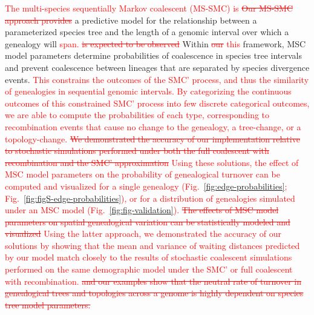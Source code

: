\documentclass[11pt]{article}
\begin{document}
\textcolor{red}{
The multi-species sequentially Markov coalescent (MS-SMC) is
\sout{Our MS-SMC approach provides}
}
a predictive model for the relationship between a parameterized species
tree and the length of a genomic interval over which a genealogy will 
\textcolor{red}{
span.
\sout{is expected to be observed}
}
% 
Within \textcolor{red}{\sout{our} this}
framework, MSC model parameters determine probabilities of coalescence
in species tree intervals and prevent coalescence between lineages that
are separated by species divergence events. 
\textcolor{red}{
This constrains the outcomes of the SMC' process, 
and thus the similarity of genealogies in sequential genomic intervals.
By categorizing the continuous outcomes of this constrained SMC' process into 
few discrete categorical outcomes, we are able to compute the probabilities of 
each type, corresponding to recombination events that cause no change to the
genealogy, a tree-change, or a topology-change.
% 
\sout{
We demonstrated the accuracy of our implementation relative to stochastic 
simulations performed under both the full coalescent with recombination 
and the SMC' approximation 
}
% 
Using these solutions, the effect of MSC model parameters on the probability
of genealogical turnover can be computed and visualized for a single genealogy
(Fig.~\ref{fig:edge-probabilities}; Fig.~\ref{fig:figS-edge-probabilities}),
or for a distribution of genealogies simulated under an MSC model
(Fig.~\ref{fig:fig-validation}).
\sout{
The effects of MSC model parameters on spatial genealogical variation can 
be statistically modeled and visualized 
}
Using the latter approach, we demonstrated the accuracy of our solutions by
showing that the mean and variance of waiting distances predicted by our model
match closely to the results of stochastic coalescent simulations performed
on the same demographic model under the SMC' or full coalescent with 
recombination.
\sout{
and our examples show that the neutral rate of turnover in genealogical trees
and topologies across a genome is highly dependent on species tree model parameters.
}
}
\end{document}
